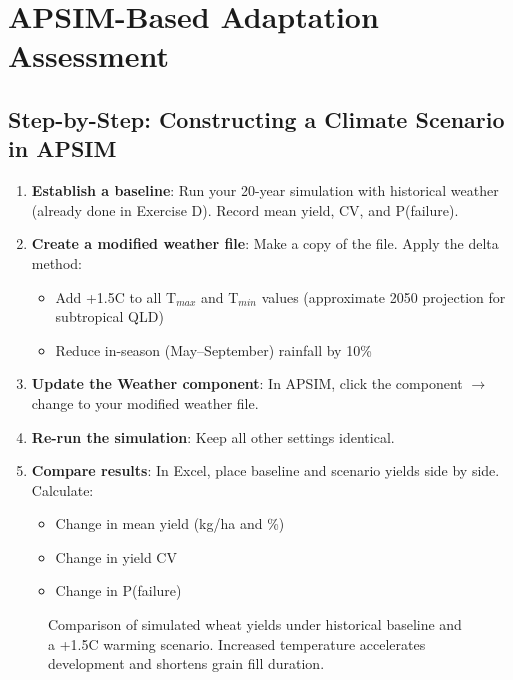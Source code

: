 \section{APSIM-Based Adaptation Assessment}

\subsection{Step-by-Step: Constructing a Climate Scenario in APSIM}

\begin{enumerate}
  \item \textbf{Establish a baseline}: Run your 20-year simulation with historical weather (already done in Exercise D). Record mean yield, CV, and P(failure).

  \item \textbf{Create a modified weather file}: Make a copy of the  file. Apply the delta method:
    \begin{itemize}
      \item Add +1.5\textdegree C to all T$_{max}$ and T$_{min}$ values (approximate 2050 projection for subtropical QLD)
      \item Reduce in-season (May--September) rainfall by 10\%
    \end{itemize}

  \item \textbf{Update the Weather component}: In APSIM, click the  component $\to$ change  to your modified weather file.

  \item \textbf{Re-run the simulation}: Keep all other settings identical.

  \item \textbf{Compare results}: In Excel, place baseline and scenario yields side by side. Calculate:
    \begin{itemize}
      \item Change in mean yield (kg/ha and \%)
      \item Change in yield CV
      \item Change in P(failure)
    \end{itemize}
\end{enumerate}

\begin{figure}[H]
  \centering
  \caption{Comparison of simulated wheat yields under historical baseline and a +1.5\textdegree C warming scenario. Increased temperature accelerates development and shortens grain fill duration.}
  \label{fig:climate-scenario}
\end{figure}

